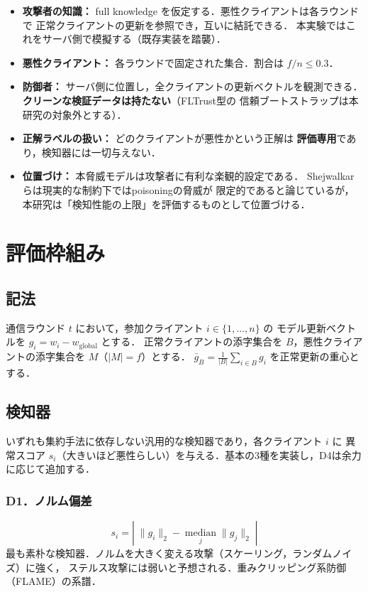 \documentclass[a4j, dvipdfmx]{jsarticle}  %
\begin{document}
\begin{itemize}
  \item \textbf{攻撃者の知識：} full knowledge を仮定する．悪性クライアントは各ラウンドで
        正常クライアントの更新を参照でき，互いに結託できる．
        本実験ではこれをサーバ側で模擬する（既存実装を踏襲）．
  \item \textbf{悪性クライアント：} 各ラウンドで固定された集合．割合は $f/n \le 0.3$．
  \item \textbf{防御者：} サーバ側に位置し，全クライアントの更新ベクトルを観測できる．
        \textbf{クリーンな検証データは持たない}（FLTrust\cite{cao2021fltrust}型の
        信頼ブートストラップは本研究の対象外とする）．
  \item \textbf{正解ラベルの扱い：} どのクライアントが悪性かという正解は
        \textbf{評価専用}であり，検知器には一切与えない．
  \item \textbf{位置づけ：} 本脅威モデルは攻撃者に有利な楽観的設定である．
        Shejwalkarら\cite{shejwalkar2022back}は現実的な制約下ではpoisoningの脅威が
        限定的であると論じているが，本研究は「検知性能の上限」を評価するものとして位置づける．
\end{itemize}

\section{評価枠組み}

\subsection{記法}

通信ラウンド $t$ において，参加クライアント $i \in \{1,\dots,n\}$ の
モデル更新ベクトルを $g_i = w_i - w_{\text{global}}$ とする．
正常クライアントの添字集合を $B$，悪性クライアントの添字集合を $M$（$|M| = f$）とする．
$\bar{g}_B = \frac{1}{|B|}\sum_{i \in B} g_i$ を正常更新の重心とする．

\subsection{検知器}
\label{sec:detectors}

いずれも集約手法に依存しない汎用的な検知器であり，各クライアント $i$ に
異常スコア $s_i$（大きいほど悪性らしい）を与える．基本の3種を実装し，D4は余力に応じて追加する．

\subsubsection*{D1．ノルム偏差}
\begin{equation}
s_i = \left|\; \|g_i\|_2 - \operatorname*{median}_{j}\|g_j\|_2 \;\right|
\end{equation}
最も素朴な検知器．ノルムを大きく変える攻撃（スケーリング，ランダムノイズ）に強く，
ステルス攻撃には弱いと予想される．重みクリッピング系防御（FLAME\cite{nguyen2022flame}）の系譜．
\end{document}
